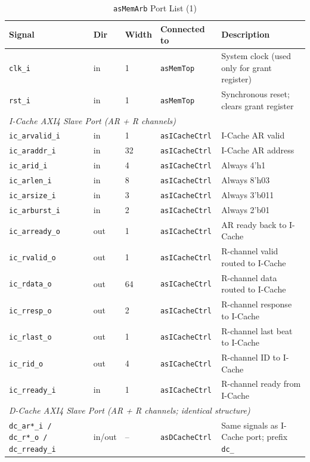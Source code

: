 \begin{table}[H]
\caption{\texttt{asMemArb} Port List (1)}
\label{tab:asMemArbPorts}
\centering
\begin{tabularx}{\textwidth}{|X |l |l |X |X|}
  \hline
  Signal & Dir & Width & Connected to & Description \\
  \hline
  \hline
  \texttt{clk\_i}  & in & 1 & \texttt{asMemTop} & System clock (used only for grant register) \\
  \hline
  \texttt{rst\_i}  & in & 1 & \texttt{asMemTop} & Synchronous reset; clears grant register \\
  \hline
  \multicolumn{5}{|l|}{\textit{I-Cache AXI4 Slave Port (AR + R channels)}} \\
  \hline
  \texttt{ic\_arvalid\_i} & in  & 1  & \texttt{asICacheCtrl} & I-Cache AR valid \\
  \hline
  \texttt{ic\_araddr\_i}  & in  & 32 & \texttt{asICacheCtrl} & I-Cache AR address \\
  \hline
  \texttt{ic\_arid\_i}    & in  & 4  & \texttt{asICacheCtrl} & Always 4'h1 \\
  \hline
  \texttt{ic\_arlen\_i}   & in  & 8  & \texttt{asICacheCtrl} & Always 8'h03 \\
  \hline
  \texttt{ic\_arsize\_i}  & in  & 3  & \texttt{asICacheCtrl} & Always 3'b011 \\
  \hline
  \texttt{ic\_arburst\_i} & in  & 2  & \texttt{asICacheCtrl} & Always 2'b01 \\
  \hline
  \texttt{ic\_arready\_o} & out & 1  & \texttt{asICacheCtrl} & AR ready back to I-Cache \\
  \hline
  \texttt{ic\_rvalid\_o}  & out & 1  & \texttt{asICacheCtrl} & R-channel valid routed to I-Cache \\
  \hline
  \texttt{ic\_rdata\_o}   & out & 64 & \texttt{asICacheCtrl} & R-channel data routed to I-Cache \\
  \hline
  \texttt{ic\_rresp\_o}   & out & 2  & \texttt{asICacheCtrl} & R-channel response to I-Cache \\
  \hline
  \texttt{ic\_rlast\_o}   & out & 1  & \texttt{asICacheCtrl} & R-channel last beat to I-Cache \\
  \hline
  \texttt{ic\_rid\_o}     & out & 4  & \texttt{asICacheCtrl} & R-channel ID to I-Cache \\
  \hline
  \texttt{ic\_rready\_i}  & in  & 1  & \texttt{asICacheCtrl} & R-channel ready from I-Cache \\
  \hline
  \multicolumn{5}{|l|}{\textit{D-Cache AXI4 Slave Port (AR + R channels; identical structure)}} \\
  \hline
  \texttt{dc\_ar*\_i / dc\_r*\_o / dc\_rready\_i} & in/out & -- & \texttt{asDCacheCtrl} & Same signals as I-Cache port; prefix \texttt{dc\_} \\
  \hline
\end{tabularx}
\end{table}

